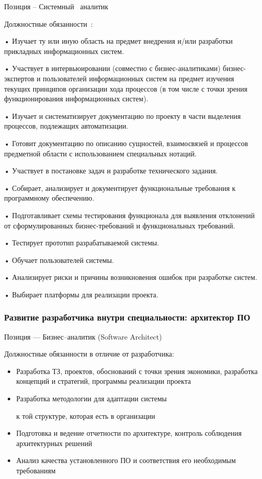 \documentclass{../industrial-development}
\begin{document}
\lecturenotes

Позиция – Системный~\cite{hh} аналитик~\cite{itcf}

Должностные обязанности~\cite{rab}:

•	Изучает ту или иную область на предмет внедрения и/или разработки прикладных информационных систем. 

•	Участвует в интервьюировании (совместно с бизнес-аналитиками) бизнес-экспертов и пользователей информационных систем на предмет изучения текущих принципов организации хода процессов (в том числе с точки зрения функционирования информационных систем). 

•	Изучает и систематизирует документацию по проекту в части выделения процессов, подлежащих автоматизации. 

•	Готовит документацию по описанию сущностей, взаимосвязей и процессов предметной области с использованием специальных нотаций. 

•	Участвует в постановке задач и разработке технического задания. 

•	Собирает, анализирует и документирует функциональные требования к программному обеспечению. 

•	Подготавливает схемы тестирования функционала для выявления отклонений от сформулированных бизнес-требований и функциональных требований. 

•	Тестирует прототип разрабатываемой системы. 

•	 Обучает пользователей системы. 

•	Анализирует риски и причины возникновения ошибок при разработке систем. 

•	Выбирает платформы для реализации проекта. 

\begin{frame} \frametitle{Развитие разработчика внутри специальности: архитектор ПО}
 \begin{block}{}
  \alert{Позиция --- Бизнес--аналитик (Software Architect)}

Должностные обязанности в отличие от разработчика: 
  \end{block}
  \begin{itemize}
\item  Разработка ТЗ, проектов, обоснований с точки зрения экономики, разработка концепций и стратегий, программы реализации проекта
  \item Разработка методологии для адаптации системы

 к той структуре, которая есть в организации
  \item Подготовка и ведение отчетности по архитектуре, контроль соблюдения архитектурных решений
 \item Анализ качества установленного ПО и соответствия его необходимым требованиям
  \end{itemize}
\end{frame}
\end{document}
